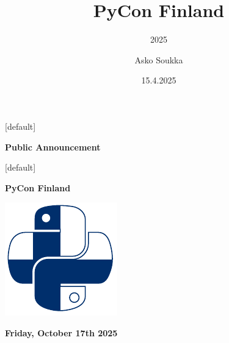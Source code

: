 \documentclass[12pt,aspectratio=169]{beamer}
\title{PyCon Finland}
\subtitle{2025}
\date{15.4.2025}
\author{Asko Soukka}
\begin{document}

[default]
\begin{frame}
\vfill
\centering \huge \textbf{Public Announcement}
\vfill
\end{frame}


{
\begin{frame}[plain]
\end{frame}
}


[default]
\begin{frame}
\vfill
\centering \huge \textbf{PyCon Finland}
\par
\centering \includegraphics[height=0.50\paperheight]{images/PyCon-Finland.pdf}
\par
\textbf{Friday, October 17th 2025}
\vfill
\end{frame}
\end{document}
